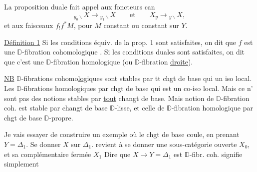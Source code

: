 
La proposition duale fait appel aux foncteurs can
\[
{}_{y_0\backslash}X\longrightarrow {}_{y_1\backslash}X
\qquad\text{et}\qquad X_y\longrightarrow {}_{y\backslash}X,
\]
et aux faisceaux $f_! f^*M$, pour $M$ constant ou  constant sur $Y$.

\uline{Définition 1} Si les conditions équiv. de la prop. 1 sont satisfaites, on dit que $f$ est une $\mathbb D$-fibration cohomologique  . Si les conditions duales sont satisfaites, on dit que c'est une $\mathbb D$-fibration homologique (ou $\mathbb D$-fibration \uline{droite}).

\uline{NB}  $\mathbb D$-fibrations cohomo\uline{lo}giques sont stables par tt chgt de base qui  un iso local. Les $\mathbb D$-fibrations homologiques par  chgt de base qui est un co-iso local. Mais ce n' sont pas des notions stables par \uline{tout} changt de base. Mais  notion de $\mathbb D$-fibration coh. est stable par changt de base $\mathbb D$-lisse, et celle de $\mathbb D$-fibration homologique par chgt de base $\mathbb D$-propre.


Je vais essayer de construire un exemple où le chgt de base coule, en prenant $Y=\Delta_1$. Se donner $X$ sur $\Delta_1$. revient à se donner une sous-catégorie ouverte $X_0$, et sa complémentaire fermée $X_1$
Dire que $X\longrightarrow Y=\Delta_1$ est  $\mathbb D$-fibr. coh. signifie simplement
